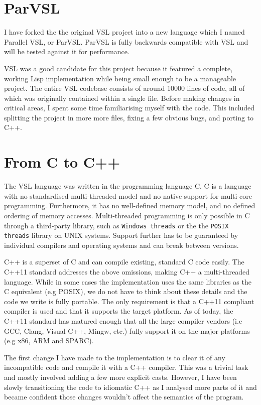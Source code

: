 \section{ParVSL}
I have forked the the original VSL project into a new language which I named Parallel VSL, or ParVSL.
ParVSL is fully backwards compatible with VSL and will be tested against it for performance.

VSL was a good candidate for this project because it featured a complete, working Lisp implementation while being
small enough to be a manageable project. The entire VSL codebase consists of around 10000 lines of code, all of which
was originally contained within a single file. Before making changes in critical areas, I spent some time familiarising
myself with the code. This included splitting the project in more more files, fixing a few obvious bugs, and porting
to C++.

\section{From C to C++}
The VSL language was written in the programming language C. C is a language with no standardised
multi-threaded model and no native support for multi-core programming. Furthermore, it has no well-defined
memory model, and no defined ordering of memory accesses. Multi-threaded programming
is only possible in C through a third-party library, such as \texttt{Windows threads} or the
the \texttt{POSIX threads} library on UNIX systems. Support further has to be guaranteed by individual compilers
and operating systems and can break between versions.

C++ is a superset of C and can compile existing, standard C code easily. The C++11 standard addresses the
above omissions, making C++ a multi-threaded language. While in some cases the implementation uses the same
libraries as the C equivalent (e.g POSIX), we do not have to think about these details and the code
we write is fully portable. The only requirement is that a C++11 compliant compiler is used and that it supports
the target platform. As of today, the C++11 standard has matured enough
that all the large compiler vendors (i.e GCC, Clang, Visual C++, Mingw, etc.) fully support it on the
major platforms (e.g x86, ARM and SPARC).

The first change I have made to the implementation is to clear it of any incompatible code and compile it
with a C++ compiler. This was a trivial task and mostly involved adding a few more explicit casts.
However, I have been slowly transitioning the code to idiomatic C++ as I analysed more parts of it
and became confident those changes wouldn't affect the semantics of the program.

